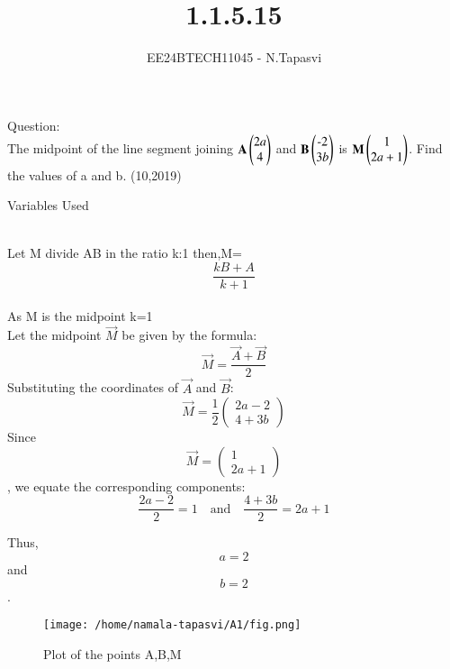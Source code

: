 \documentclass[journal]{IEEEtran}
\begin{document}

\vspace{3cm}

\title{1.1.5.15}
\author{EE24BTECH11045 - N.Tapasvi}
{\let\newpage\relax\maketitle}
Question:\\
The midpoint of the line segment joining $\mathbf{A}\begin{pmatrix}2a\\4\end{pmatrix}$ and $\mathbf{B}\begin{pmatrix}\text{-}2\\3b\end{pmatrix}$ is $\mathbf{M}\begin{pmatrix}1\\2a+1\end{pmatrix}$. Find the values of a and b.
\hfill (10,2019)

\solution
\begin{table}[h!]    
  \centering
  
  \caption{Variables Used}
  \label{tab1-1.5-15}
\end{table}\\

Let M divide AB in the ratio k:1
then,M=$$\frac{kB+A}{k+1}$$\\

As M is the midpoint k=1\\

Let the midpoint \( \vec{M} \) be given by the formula:
$$\vec{M} = \frac{\vec{A} + \vec{B}}{2}$$
Substituting the coordinates of \( \vec{A} \) and \( \vec{B} \):
$$\vec{M} = \frac{1}{2} \begin{pmatrix} 2a - 2 \\ 4 + 3b \end{pmatrix}$$
Since $$\vec{M} = \begin{pmatrix} 1 \\ 2a+1 \end{pmatrix}$$, we equate the corresponding components:
$$\frac{2a - 2}{2} = 1 \quad \text{and} \quad \frac{4 + 3b}{2} = 2a + 1$$

Thus, $$a = 2$$ and $$b = 2$$.


\begin{figure}[h!]
   \centering
	\texttt{[image: /home/namala-tapasvi/A1/fig.png]}
   \caption{Plot of the points A,B,M}
   \label{stemplot}
\end{figure}
\end{document}
